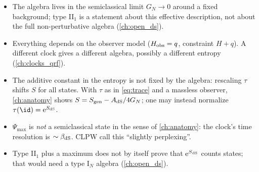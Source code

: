 \begin{whatwrong}
\begin{itemize}
\item The algebra lives in the semiclassical limit $G_N\to0$ around a fixed background; type II$_1$ is a statement about this effective description, not about the full non-perturbative algebra (\cref{ch:open_ds}).
\item Everything depends on the observer model ($H_{\rm obs}=q$, constraint $H+q$). A different clock gives a different algebra, possibly a different entropy (\cref{ch:clocks_qrf}).
\item The additive constant in the entropy is not fixed by the algebra: rescaling $\tau$ shifts $S$ for all states. With $\tau$ as in \eqref{eq:trace} and a massless observer, \cref{ch:anatomy} shows $S=S_{\mathrm{gen}}-A_{\rm dS}/4G_N$; one may instead normalize $\tau(\id)=\ee^{S_{\rm dS}}$.
\item $\Psi_{\max}$ is \emph{not} a semiclassical state in the sense of \cref{ch:anatomy}: the clock's time resolution is $\sim\beta_{\rm dS}$. CLPW call this ``slightly perplexing''.
\item Type II$_1$ plus a maximum does not by itself prove that $\mathrm{e}^{S_{\rm dS}}$ counts states; that would need a type I$_N$ algebra (\cref{ch:open_ds}).
\end{itemize}
\end{whatwrong}

